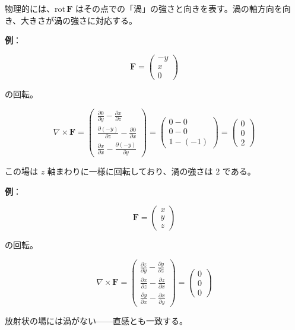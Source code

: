 \documentclass[a4paper,12pt,openany]{book}
\begin{document}
物理的には、\(\mathrm{rot}\,\mathbf{F}\)
はその点での「渦」の強さと向きを表す。渦の軸方向を向き、大きさが渦の強さに対応する。

\textbf{例}：

\[
\mathbf{F}
=
\begin{pmatrix}
-y\\
x\\
0
\end{pmatrix}
\]

の回転。

\[\nabla \times \mathbf{F} = \begin{pmatrix}
\frac{\partial 0}{\partial y} - \frac{\partial x}{\partial z} \\[0.3em]
\frac{\partial (-y)}{\partial z} - \frac{\partial 0}{\partial x} \\[0.3em]
\frac{\partial x}{\partial x} - \frac{\partial (-y)}{\partial y}
\end{pmatrix} = \begin{pmatrix}
0 - 0 \\ 0 - 0 \\ 1 - (-1)
\end{pmatrix} = \begin{pmatrix} 0 \\ 0 \\ 2 \end{pmatrix}\]

この場は \(z\) 軸まわりに一様に回転しており、渦の強さは \(2\) である。

\textbf{例}：

\[
\mathbf{F}
=
\begin{pmatrix}
x\\
y\\
z
\end{pmatrix}
\]

の回転。

\[\nabla \times \mathbf{F} = \begin{pmatrix}
\frac{\partial z}{\partial y} - \frac{\partial y}{\partial z} \\[0.3em]
\frac{\partial x}{\partial z} - \frac{\partial z}{\partial x} \\[0.3em]
\frac{\partial y}{\partial x} - \frac{\partial x}{\partial y}
\end{pmatrix} = \begin{pmatrix} 0 \\ 0 \\ 0 \end{pmatrix}\]

放射状の場には渦がない——直感とも一致する。
\end{document}
